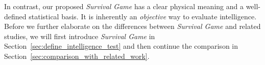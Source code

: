 In contrast, our proposed \textit{Survival Game} has a clear physical meaning and a well-defined statistical basis. It is inherently an \textit{objective} way to evaluate intelligence. Before we further elaborate on the differences between \textit{Survival Game} and related studies, we will first introduce \textit{Survival Game} in Section~\ref{sec:define_intelligence_test} and then continue the comparison in Section~\ref{sec:comparison_with_related_work}.


